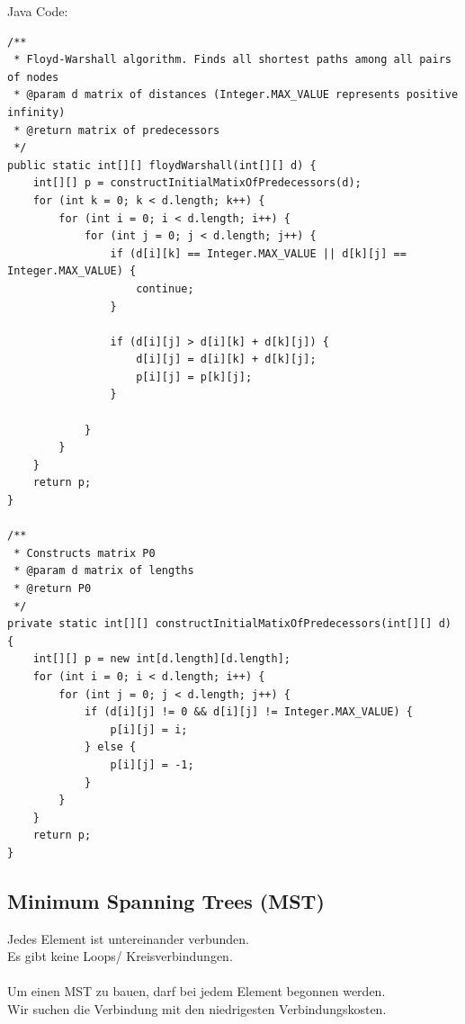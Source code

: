 \documentclass[a4paper,10pt]{report}
\begin{document}
\newpage
\noindent
Java Code:
\begin{lstlisting}
/**
 * Floyd-Warshall algorithm. Finds all shortest paths among all pairs of nodes
 * @param d matrix of distances (Integer.MAX_VALUE represents positive infinity)
 * @return matrix of predecessors
 */
public static int[][] floydWarshall(int[][] d) {
    int[][] p = constructInitialMatixOfPredecessors(d);
    for (int k = 0; k < d.length; k++) {
        for (int i = 0; i < d.length; i++) {
            for (int j = 0; j < d.length; j++) {
                if (d[i][k] == Integer.MAX_VALUE || d[k][j] == Integer.MAX_VALUE) {
                    continue;                  
                }
                
                if (d[i][j] > d[i][k] + d[k][j]) {
                    d[i][j] = d[i][k] + d[k][j];
                    p[i][j] = p[k][j];
                }

            }
        }
    }
    return p;
}

/**
 * Constructs matrix P0
 * @param d matrix of lengths
 * @return P0
 */
private static int[][] constructInitialMatixOfPredecessors(int[][] d) {
    int[][] p = new int[d.length][d.length];
    for (int i = 0; i < d.length; i++) {
        for (int j = 0; j < d.length; j++) {
            if (d[i][j] != 0 && d[i][j] != Integer.MAX_VALUE) {
                p[i][j] = i;
            } else {
                p[i][j] = -1;
            }
        }
    }
    return p;
}
\end{lstlisting}
\newpage
\subsection{Minimum Spanning Trees (MST)}
Jedes Element ist untereinander verbunden.\\
Es gibt keine Loops/ Kreisverbindungen.\\
\\
Um einen MST zu bauen, darf bei jedem Element begonnen werden.\\
Wir suchen die Verbindung mit den niedrigesten Verbindungskosten.
\end{document}
